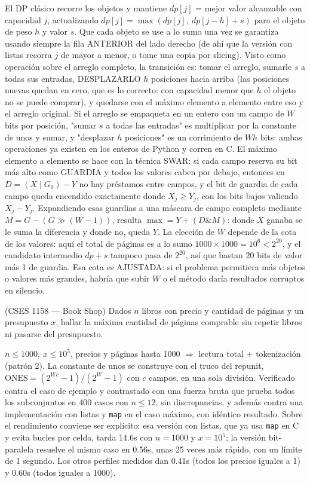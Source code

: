  El DP clásico recorre los objetos y mantiene $dp[j]$ = mejor valor alcanzable con capacidad $j$, actualizando $dp[j] = \max(dp[j],\ dp[j - h] + s)$ para el objeto de peso $h$ y valor $s$. Que cada objeto se use a lo sumo una vez se garantiza usando siempre la fila ANTERIOR del lado derecho (de ahí que la versión con listas recorra $j$ de mayor a menor, o tome una copia por slicing). Visto como operación sobre el arreglo completo, la transición es: tomar el arreglo, sumarle $s$ a todas sus entradas, DESPLAZARLO $h$ posiciones hacia arriba (las posiciones nuevas quedan en cero, que es lo correcto: con capacidad menor que $h$ el objeto no se puede comprar), y quedarse con el máximo elemento a elemento entre eso y el arreglo original. Si el arreglo se empaqueta en un entero con un campo de $W$ bits por posición, "sumar $s$ a todas las entradas" es multiplicar por la constante de unos y sumar, y "desplazar $h$ posiciones" es un corrimiento de $W h$ bits: ambas operaciones ya existen en los enteros de Python y corren en C. El máximo elemento a elemento se hace con la técnica SWAR: si cada campo reserva su bit más alto como GUARDIA y todos los valores caben por debajo, entonces en $D = (X \mathbin{|} G_0) - Y$ no hay préstamos entre campos, y el bit de guardia de cada campo queda encendido exactamente donde $X_j \ge Y_j$, con los bits bajos valiendo $X_j - Y_j$. Expandiendo esas guardias a una máscara de campo completo mediante $M = G - (G \gg (W-1))$, resulta $\max = Y + (D \mathbin{\&} M)$: donde $X$ ganaba se le suma la diferencia y donde no, queda $Y$. La elección de $W$ depende de la cota de los valores: aquí el total de páginas es a lo sumo $1000 \times 1000 = 10^6 < 2^{20}$, y el candidato intermedio $dp + s$ tampoco pasa de $2^{20}$, así que bastan 20 bits de valor más 1 de guardia. Esa cota es AJUSTADA: si el problema permitiera más objetos o valores más grandes, habría que subir $W$ o el método daría resultados corruptos en silencio.~\cite{bellman1957}


(CSES 1158 — Book Shop) Dados $n$ libros con precio y cantidad de páginas y un presupuesto $x$, hallar la máxima cantidad de páginas comprable sin repetir libros ni pasarse del presupuesto.

 $n \le 1000$, $x \le 10^5$, precios y páginas hasta 1000 $\Rightarrow$ lectura total + tokenización (patrón 2). La constante de unos se construye con el truco del repunit, $\text{ONES} = (2^{Wc} - 1)/(2^W - 1)$ con $c$ campos, en una sola división. Verificado contra el caso de ejemplo y contrastado con una fuerza bruta que prueba todos los subconjuntos en 400 casos con $n \le 12$, sin discrepancias, y además contra una implementación con listas y \texttt{map} en el caso máximo, con idéntico resultado. Sobre el rendimiento conviene ser explícito: esa versión con listas, que ya usa \texttt{map} en C y evita bucles por celda, tarda \aprox{}14.6s con $n = 1000$ y $x = 10^5$; la versión bit-paralela resuelve el mismo caso en \aprox{}0.56s, unas 25 veces más rápido, con un límite de 1 segundo. Los otros perfiles medidos dan \aprox{}0.41s (todos los precios iguales a 1) y \aprox{}0.60s (todos iguales a 1000).

